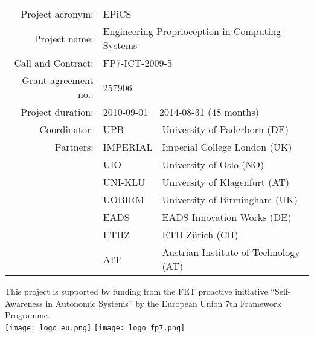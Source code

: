 \documentclass[DIV15,a4paper]{scrartcl}
\begin{document}
\begin{titlepage}
\begin{center}



	\vspace{5cm}
{
\footnotesize
\begin{tabular}{rll}

	Project acronym:			& \multicolumn{2}{l}{EPiCS} \\
	Project name:					& \multicolumn{2}{l}{Engineering Proprioception in Computing Systems} \\
	Call and Contract:		& \multicolumn{2}{l}{FP7-ICT-2009-5} \\
	Grant agreement no.:  & \multicolumn{2}{l}{257906} \\
	Project duration:			& \multicolumn{2}{l}{2010-09-01 -- 2014-08-31 (48 months)} \\
	Coordinator:					& UPB & University of Paderborn (DE) \\
	Partners:							& IMPERIAL & Imperial College London (UK) \\
												& UIO & University of Oslo (NO) \\
												& UNI-KLU & University of Klagenfurt (AT) \\
												& UOBIRM & University of Birmingham (UK) \\
												& EADS & EADS Innovation Works (DE) \\
												& ETHZ & ETH Z\"urich (CH) \\
												& AIT & Austrian Institute of Technology (AT) \\
\end{tabular}


}

	\vspace{3cm}
	
	{\footnotesize This project is supported by funding from the FET proactive initiative ``Self-Awareness in Autonomic Systems'' by the European Union 7th Framework Programme.\\[2ex]
	\texttt{[image: logo\_eu.png]} \hspace{1cm} \texttt{[image: logo\_fp7.png]}}
\end{center}


\end{titlepage}
\end{document}
